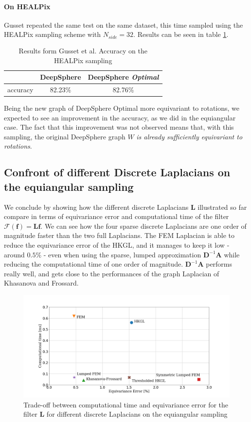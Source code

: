 \paragraph{On HEALPix }
Gusset repeated the same test on the same dataset, this time sampled using the HEALPix sampling scheme with $N_{side}=32$. Results can be seen in table \ref{table:results}.
\begin{table}[h!]
	\centering
	\begin{tabular}{ c|c|c } 
		& DeepSphere & DeepSphere \textit{Optimal} \\ 
		\hline
		accuracy & 82.23\% & 82.76\% \\ 
	\end{tabular}
	\caption{\label{table:results}Results form Gusset et al. Accuracy on the HEALPix sampling}
\end{table}
Being the new graph of DeepSphere Optimal more equivariant to rotations, we expected to see an improvement in the accuracy, as we did in the equiangular case. The fact that this improvement was not observed means that, with this sampling, the original DeepSphere graph $W$ \textit{is already sufficiently equivariant to rotations}.

\subsection{Confront of different Discrete Laplacians on the equiangular sampling}
We conclude by showing how the different discrete Laplacians $\mathbf L$ illustrated so far compare in terms of equivariance error and computational time of the filter $\mathcal F(\mathbf f) = \mathbf L\mathbf f$. We can see how the four sparse discrete Laplacians are one order of magnitude faster than the two full Laplacians. The FEM Laplacian is able to reduce the equivariance error of the HKGL, and it manages to keep it low - around $0.5\%$ - even when using the sparse, lumped approximation $\mathbf D^{-1}\mathbf A$ while reducing the computational time of one order of magnitude. $\mathbf D^{-1}\mathbf A$ performs really well, and gets close to the performances of the graph Laplacian of Khasanova and Frossard. 
\begin{figure}[h!]
	\centering
	\includegraphics[width=\textwidth]{../codes/06.Equivariance_error/tradeoff.png}
	\caption{\label{fig:tradeoff}Trade-off between computational time and equivariance error for the filter $\mathbf L$ for different discrete Laplacians on the equiangular sampling}
\end{figure}

